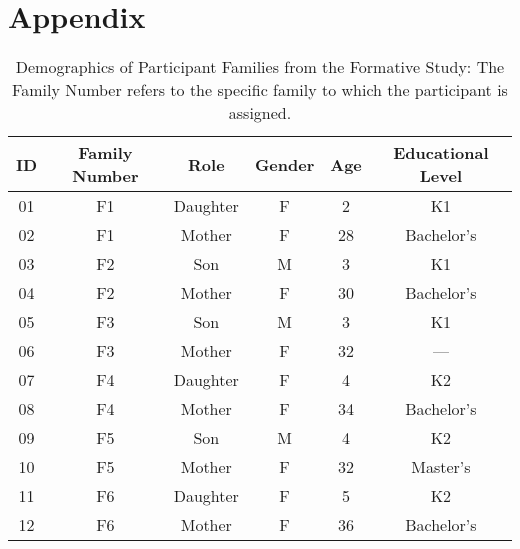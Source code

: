 \newpage
\appendix
\section{Appendix}

\begin{table*}[tb]
\centering
\tabcolsep=0.5cm
\begin{tabular}{cccccc}\hline
\textbf{ID} & \textbf{Family Number} & \textbf{Role} & \textbf{Gender} & \textbf{Age} & \textbf{Educational Level} \\\hline
01 & F1 & Daughter & F & 2  & K1         \\\rowcolor{customcolor}
02 & F1 & Mother   & F & 28 & Bachelor’s \\
03 & F2 & Son      & M & 3  & K1         \\\rowcolor{customcolor}
04 & F2 & Mother   & F & 30 & Bachelor’s \\
05 & F3 & Son      & M & 3  & K1         \\\rowcolor{customcolor}
06 & F3 & Mother   & F & 32 & —          \\
07 & F4 & Daughter & F & 4  & K2         \\\rowcolor{customcolor}
08 & F4 & Mother   & F & 34 & Bachelor’s \\
09 & F5 & Son      & M & 4  & K2         \\\rowcolor{customcolor}
10 & F5 & Mother   & F & 32 & Master’s   \\
11 & F6 & Daughter & F & 5  & K2         \\\rowcolor{customcolor}
12 & F6 & Mother   & F & 36 & Bachelor’s\\\hline
\end{tabular}
\caption{Demographics of Participant Families from the Formative Study: The Family Number refers to the specific family to which the participant is assigned.}
\label{tab:family1}
\end{table*}


